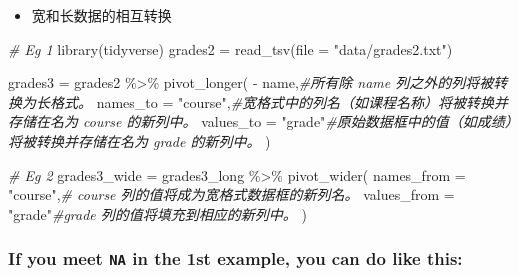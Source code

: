\documentclass[
]{article}
\newenvironment{Shaded}{}{}
\newcommand{\AttributeTok}[1]{\textcolor[rgb]{0.49,0.56,0.16}{#1}}
\newcommand{\CommentTok}[1]{\textcolor[rgb]{0.38,0.63,0.69}{\textit{#1}}}
\newcommand{\FunctionTok}[1]{\textcolor[rgb]{0.02,0.16,0.49}{#1}}
\newcommand{\NormalTok}[1]{#1}
\newcommand{\OtherTok}[1]{\textcolor[rgb]{0.00,0.44,0.13}{#1}}
\newcommand{\SpecialCharTok}[1]{\textcolor[rgb]{0.25,0.44,0.63}{#1}}
\newcommand{\StringTok}[1]{\textcolor[rgb]{0.25,0.44,0.63}{#1}}
\begin{document}
\begin{itemize}
\item
  宽和长数据的相互转换
\end{itemize}

\begin{Shaded}
\begin{Highlighting}[]
\CommentTok{\# Eg 1}
\FunctionTok{library}\NormalTok{(tidyverse)}
\NormalTok{grades2 }\OtherTok{=}
	\FunctionTok{read\_tsv}\NormalTok{(}\AttributeTok{file =} \StringTok{"data/grades2.txt"}\NormalTok{)}

\NormalTok{grades3 }\OtherTok{=}
\NormalTok{	grades2 }\SpecialCharTok{\%\textgreater{}\%} 
	\FunctionTok{pivot\_longer}\NormalTok{( }
    \SpecialCharTok{{-}}\NormalTok{ name,}\CommentTok{\#所有除 name 列之外的列将被转换为长格式。}
    \AttributeTok{names\_to =} \StringTok{"course"}\NormalTok{,}\CommentTok{\#宽格式中的列名（如课程名称）将被转换并存储在名为 course 的新列中。}
    \AttributeTok{values\_to =} \StringTok{"grade"}\CommentTok{\#原始数据框中的值（如成绩）将被转换并存储在名为 grade 的新列中。}
\NormalTok{  )}

\CommentTok{\# Eg 2}
\NormalTok{grades3\_wide }\OtherTok{=}\NormalTok{ grades3\_long }\SpecialCharTok{\%\textgreater{}\%} 
  \FunctionTok{pivot\_wider}\NormalTok{(}
    \AttributeTok{names\_from =} \StringTok{"course"}\NormalTok{,}\CommentTok{\# course 列的值将成为宽格式数据框的新列名。}
    \AttributeTok{values\_from =} \StringTok{"grade"}\CommentTok{\#grade 列的值将填充到相应的新列中。}
\NormalTok{  )}
\end{Highlighting}
\end{Shaded}

\hypertarget{if-you-meet-na-in-the-1st-example-you-can-do-like-this}{%
\subsubsection{\texorpdfstring{If you meet \texttt{NA} in the 1st
example, you can do like
this:}{If you meet NA in the 1st example, you can do like this:}}\label{if-you-meet-na-in-the-1st-example-you-can-do-like-this}}
\end{document}
